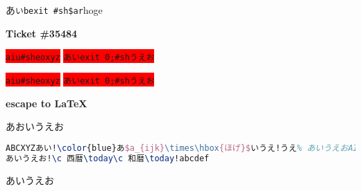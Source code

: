 \documentclass{jarticle}
\begin{document}
あ\lstinline[basicstyle=\tt]{いbexit #sh$ar}hoge

\bigskip
\textbf{Ticket \#35484}

\colorbox{red}{\lstinline!aiu#sheoxyz!}
\colorbox{red}{\lstinline!あいexit 0;#shうえお!}


\colorbox{red}{\lstinline{aiu#sheoxyz}}
\colorbox{red}{\lstinline{あいexit 0;#shうえお}}

\bigskip
\textbf{escape to \LaTeX}

あおいうえお
\begin{lstlisting}[commentstyle=\color{green}\bfseries,
  frame=single,language=TeX, escapechar=!]
ABCXYZあい!\color{blue}あ$a_{ijk}\times\hbox{ほげ}$いうえ!うえ% あいうえおAIg
あいうえお!\c 西暦\today\c 和暦\today!abcdef
\end{lstlisting}
あいうえお
\end{document}
